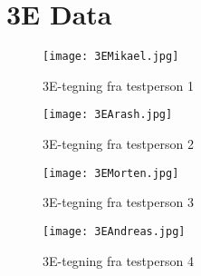 \chapter{3E Data}\label{app:3E}
\begin{figure}[h]
\centering
\texttt{[image: 3EMikael.jpg]}
\caption{3E-tegning fra testperson 1}
\label{fig:3EMikael}
\end{figure}

\begin{figure}[h]
\centering
\texttt{[image: 3EArash.jpg]}
\caption{3E-tegning fra testperson 2}
\label{fig:3EArash}
\end{figure}

\begin{figure}[h]
\centering
\texttt{[image: 3EMorten.jpg]}
\caption{3E-tegning fra testperson 3}
\label{fig:3EMorten}
\end{figure}

\begin{figure}[h]
\centering
\texttt{[image: 3EAndreas.jpg]}
\caption{3E-tegning fra testperson 4}
\label{fig:3EAndreas}
\end{figure}
